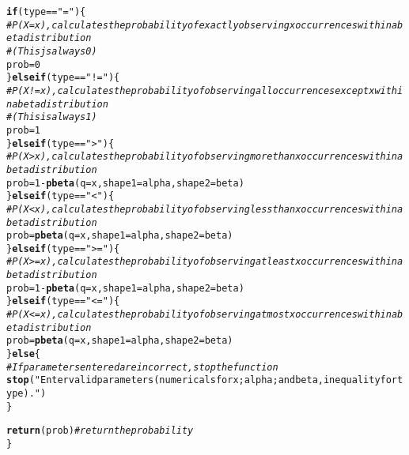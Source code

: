 \documentclass{article}\usepackage[]{graphicx}\usepackage[]{xcolor}
\makeatletter
\newcommand{\hlnum}[1]{\textcolor[rgb]{0.686,0.059,0.569}{#1}}%
\newcommand{\hlsng}[1]{\textcolor[rgb]{0.192,0.494,0.8}{#1}}%
\newcommand{\hlcom}[1]{\textcolor[rgb]{0.678,0.584,0.686}{\textit{#1}}}%
\newcommand{\hlopt}[1]{\textcolor[rgb]{0,0,0}{#1}}%
\newcommand{\hldef}[1]{\textcolor[rgb]{0.345,0.345,0.345}{#1}}%
\newcommand{\hlkwa}[1]{\textcolor[rgb]{0.161,0.373,0.58}{\textbf{#1}}}%
\newcommand{\hlkwb}[1]{\textcolor[rgb]{0.69,0.353,0.396}{#1}}%
\newcommand{\hlkwc}[1]{\textcolor[rgb]{0.333,0.667,0.333}{#1}}%
\newcommand{\hlkwd}[1]{\textcolor[rgb]{0.737,0.353,0.396}{\textbf{#1}}}%
\newenvironment{kframe}{%
 \def\at@end@of@kframe{}%
 \ifinner\ifhmode%
  \def\at@end@of@kframe{\end{minipage}}%
  \begin{minipage}{\columnwidth}%
 \fi\fi%
 \def\FrameCommand##1{\hskip\@totalleftmargin \hskip-\fboxsep
 \colorbox{shadecolor}{##1}\hskip-\fboxsep
     \hskip-\linewidth \hskip-\@totalleftmargin \hskip\columnwidth}%
 \MakeFramed {\advance\hsize-\width
   \@totalleftmargin\z@ \linewidth\hsize
   \@setminipage}}%
 {\par\unskip\endMakeFramed%
 \at@end@of@kframe}
\newenvironment{knitrout}{}{} %
\makeatother
\begin{document}
\begin{enumerate}
\begin{knitrout}
\begin{kframe}
\begin{alltt}
  \hlkwa{if}\hldef{(type} \hlopt{==} \hlsng{"="}\hldef{)\{}
    \hlcom{#P(X=x), calculates the probability of exactly observing x occurrences within a beta distribution}
    \hlcom{#(This js always 0)}
    \hldef{prob} \hlkwb{=} \hlnum{0}
  \hldef{\}} \hlkwa{else if}\hldef{(type} \hlopt{==} \hlsng{"!="}\hldef{)\{}
    \hlcom{#P(X!=x), calculates the probability of observing all occurrences except x within a beta distribution}
    \hlcom{#(This is always 1)}
    \hldef{prob} \hlkwb{=} \hlnum{1}
  \hldef{\}} \hlkwa{else if}\hldef{(type} \hlopt{==} \hlsng{">"}\hldef{) \{}
    \hlcom{#P(X>x), calculates the probability of observing more than x occurrences within a beta distribution}
    \hldef{prob} \hlkwb{=} \hlnum{1} \hlopt{-} \hlkwd{pbeta}\hldef{(}\hlkwc{q} \hldef{= x,} \hlkwc{shape1} \hldef{= alpha,} \hlkwc{shape2} \hldef{= beta)}
  \hldef{\}} \hlkwa{else if}\hldef{(type} \hlopt{==} \hlsng{"<"}\hldef{) \{}
    \hlcom{#P(X<x), calculates the probability of observing less than x occurrences within a beta distribution}
    \hldef{prob} \hlkwb{=} \hlkwd{pbeta}\hldef{(}\hlkwc{q} \hldef{= x,} \hlkwc{shape1} \hldef{= alpha,} \hlkwc{shape2} \hldef{= beta)}
  \hldef{\}} \hlkwa{else if}\hldef{(type} \hlopt{==} \hlsng{">="}\hldef{) \{}
    \hlcom{#P(X>=x), calculates the probability of observing at least x occurrences within a beta distribution}
    \hldef{prob} \hlkwb{=} \hlnum{1} \hlopt{-} \hlkwd{pbeta}\hldef{(}\hlkwc{q} \hldef{= x,} \hlkwc{shape1} \hldef{= alpha,} \hlkwc{shape2} \hldef{= beta)}
  \hldef{\}} \hlkwa{else if}\hldef{(type} \hlopt{==} \hlsng{"<="}\hldef{) \{}
    \hlcom{#P(X<=x), calculates the probability of observing at most x occurrences within a beta distribution}
    \hldef{prob} \hlkwb{=} \hlkwd{pbeta}\hldef{(}\hlkwc{q} \hldef{= x,} \hlkwc{shape1} \hldef{= alpha,} \hlkwc{shape2} \hldef{= beta)}
  \hldef{\}} \hlkwa{else} \hldef{\{}
    \hlcom{#If parameters entered are incorrect, stop the function}
    \hlkwd{stop}\hldef{(}\hlsng{"Enter valid parameters (numericals for x; alpha; and beta, inequality for type)."}\hldef{)}
  \hldef{\}}

  \hlkwd{return}\hldef{(prob)} \hlcom{#return the probability}
\hldef{\}}
\end{alltt}
\end{kframe}
\end{knitrout}
\end{enumerate}

\end{document}
